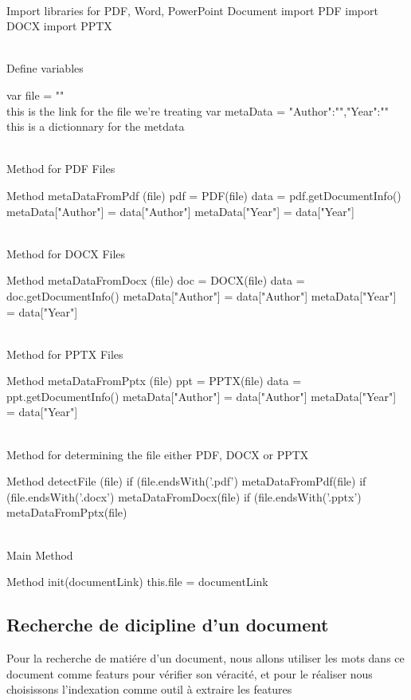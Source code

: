 \documentclass[12pt]{report}
\begin{document}
\begin{customFrame}
\\ Import libraries for PDF, Word, PowerPoint Document 
import PDF
import DOCX
import PPTX

\\ Define variables 

var file = "" \\ this is the link for the file we're treating
var metaData = {"Author":"","Year":""} \\ this is a dictionnary for the metdata

\\ Method for PDF Files

Method metaDataFromPdf (file) {
	pdf = PDF(file)
	data = pdf.getDocumentInfo()
	metaData["Author"] = data["Author"]
	metaData["Year"] = data["Year"]
}

\\ Method for DOCX Files

Method metaDataFromDocx (file) {
	doc = DOCX(file)
	data = doc.getDocumentInfo()
	metaData["Author"] = data["Author"]
	metaData["Year"] = data["Year"]
}

\\ Method for PPTX Files

Method metaDataFromPptx (file) {
	ppt = PPTX(file)
	data = ppt.getDocumentInfo()
	metaData["Author"] = data["Author"]
	metaData["Year"] = data["Year"]
}

\\ Method for determining the file either PDF, DOCX or PPTX

Method detectFile (file) {
	if (file.endsWith('.pdf') {
		metaDataFromPdf(file)
	} if (file.endsWith('.docx') {
		metaDataFromDocx(file)
	} if (file.endsWith('.pptx') {
		metaDataFromPptx(file)
	}
}

\\ Main Method

Method init(documentLink) {
	this.file = documentLink
}

\end{customFrame}

\subsection{Recherche de dicipline d'un document}

Pour la recherche de matiére d'un document, nous allons utiliser les mots dans ce document comme featurs pour vérifier son véracité, et pour le réaliser nous choisissons l'indexation comme outil à extraire les features\\
\end{document}
